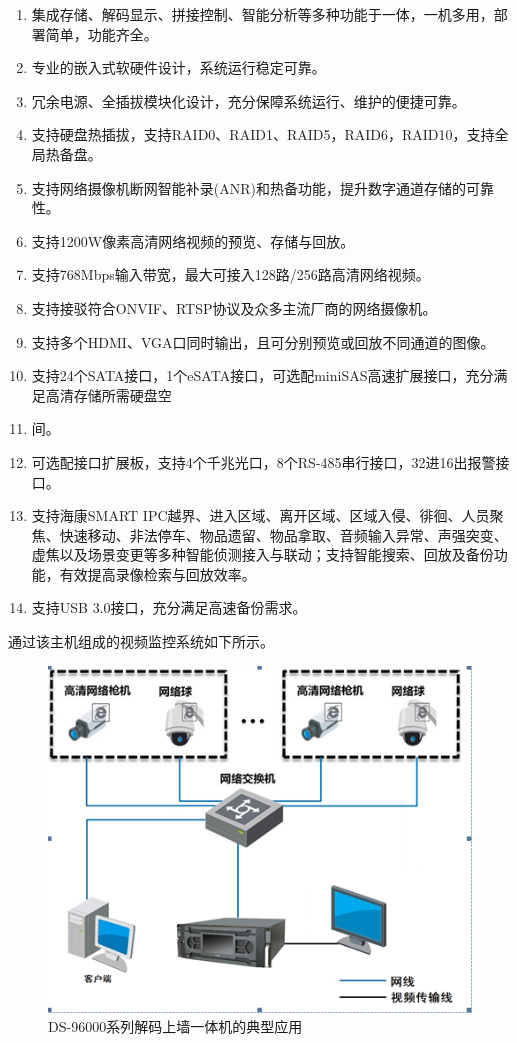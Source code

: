 \documentclass{gdutart}
\begin{document}
      \begin{enumerate}[label={(\arabic*)}]
        \item 集成存储、解码显示、拼接控制、智能分析等多种功能于一体，一机多用，部署简单，功能齐全。
        \item 专业的嵌入式软硬件设计，系统运行稳定可靠。
        \item 冗余电源、全插拔模块化设计，充分保障系统运行、维护的便捷可靠。
        \item 支持硬盘热插拔，支持RAID0、RAID1、RAID5，RAID6，RAID10，支持全局热备盘。
        \item 支持网络摄像机断网智能补录(ANR)和热备功能，提升数字通道存储的可靠性。
        \item 支持1200W像素高清网络视频的预览、存储与回放。
        \item 支持768Mbps输入带宽，最大可接入128路/256路高清网络视频。
        \item 支持接驳符合ONVIF、RTSP协议及众多主流厂商的网络摄像机。
        \item 支持多个HDMI、VGA口同时输出，且可分别预览或回放不同通道的图像。
        \item 支持24个SATA接口，1个eSATA接口，可选配miniSAS高速扩展接口，充分满足高清存储所需硬盘空\item 间。
        \item 可选配接口扩展板，支持4个千兆光口，8个RS-485串行接口，32进16出报警接口。
        \item 支持海康SMART IPC越界、进入区域、离开区域、区域入侵、徘徊、人员聚焦、快速移动、非法停车、物品遗留、物品拿取、音频输入异常、声强突变、虚焦以及场景变更等多种智能侦测接入与联动；支持智能搜索、回放及备份功能，有效提高录像检索与回放效率。
        \item 支持USB 3.0接口，充分满足高速备份需求。
      \end{enumerate}

      通过该主机组成的视频监控系统如下所示。
      \begin{figure}[htpb]
        \begin{center}
          \includegraphics[scale=0.5]{img/monitoring.png}
        \end{center}
        \caption{DS-96000系列解码上墙一体机的典型应用}\label{fig:fig3}
      \end{figure}
\end{document}
